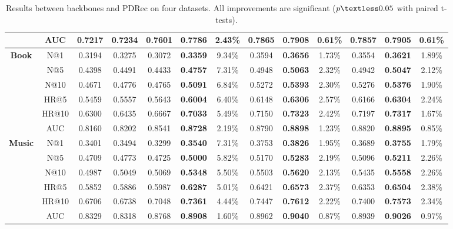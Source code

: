 \documentclass[letterpaper]{article} %
\begin{document}
\begin{table}[!t]
\begin{tabular}{|c|c|cc|ccc|ccc|ccc|}
    & AUC   & 0.7217 & 0.7234 & 0.7601 & \textbf{0.7786} & 2.43\% & 0.7865 & \textbf{0.7908} & 0.61\%  & 0.7857 & \textbf{0.7905} & 0.61\%  \\ \hline
\multirow{6}{*}{\textbf{Book}}  
    & N@1   & 0.3194 & 0.3275 & 0.3072 & \textbf{0.3359} & 9.34\% & 0.3594 & \textbf{0.3656} & 1.73\%  & 0.3554 & \textbf{0.3621} & 1.89\%  \\
    & N@5   & 0.4398 & 0.4491 & 0.4433 & \textbf{0.4757} & 7.31\% & 0.4948 & \textbf{0.5063} & 2.32\%  & 0.4942 & \textbf{0.5047} & 2.12\%  \\
    & N@10  & 0.4671 & 0.4776 & 0.4765 & \textbf{0.5091} & 6.84\% & 0.5272 & \textbf{0.5393} & 2.30\%  & 0.5276 & \textbf{0.5376} & 1.90\%  \\
    & HR@5  & 0.5459 & 0.5557 & 0.5643 & \textbf{0.6004} & 6.40\% & 0.6148 & \textbf{0.6306} & 2.57\%  & 0.6166 & \textbf{0.6304} & 2.24\%  \\
    & HR@10 & 0.6300 & 0.6435 & 0.6667 & \textbf{0.7033} & 5.49\% & 0.7150 & \textbf{0.7323} & 2.42\%  & 0.7197 & \textbf{0.7317} & 1.67\%  \\
    & AUC   & 0.8160 & 0.8202 & 0.8541 & \textbf{0.8728} & 2.19\% & 0.8790 & \textbf{0.8898} & 1.23\%  & 0.8820 & \textbf{0.8895} & 0.85\%  \\ \hline
\multirow{6}{*}{\textbf{Music}} 
    & N@1   & 0.3401 & 0.3494 & 0.3299 & \textbf{0.3540} & 7.31\% & 0.3753 & \textbf{0.3826} & 1.95\%  & 0.3689 & \textbf{0.3755} & 1.79\%  \\
    & N@5   & 0.4709 & 0.4773 & 0.4725 & \textbf{0.5000} & 5.82\% & 0.5170  & \textbf{0.5283} & 2.19\%  & 0.5096 & \textbf{0.5211} & 2.26\%  \\
    & N@10  & 0.4987 & 0.5049 & 0.5069 & \textbf{0.5348} & 5.50\% & 0.5503 & \textbf{0.5620} & 2.13\% & 0.5435 & \textbf{0.5558} & 2.26\%  \\
    & HR@5  & 0.5852 & 0.5886 & 0.5987 & \textbf{0.6287} & 5.01\% & 0.6421 & \textbf{0.6573} & 2.37\%  & 0.6353 & \textbf{0.6504} & 2.38\%  \\
    & HR@10 & 0.6706 & 0.6738 & 0.7048 & \textbf{0.7361} & 4.44\% & 0.7447 & \textbf{0.7612} & 2.22\%  & 0.7400 & \textbf{0.7573} & 2.34\%  \\
    & AUC   & 0.8329 & 0.8318 & 0.8768 & \textbf{0.8908} & 1.60\% & 0.8962 & \textbf{0.9040}  & 0.87\% & 0.8939 & \textbf{0.9026} & 0.97\%  \\ \hline
\end{tabular}
\caption{Results between backbones and PDRec on four datasets. All improvements are significant ($p \textless 0.05$ with paired t-tests).}
\label{tab:main_results}
\end{table}
\end{document}
